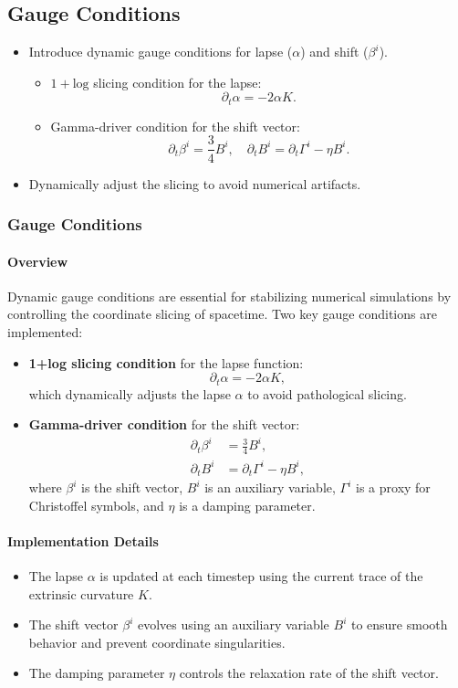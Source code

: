 \documentclass[12pt]{article}
\begin{document}
\subsection{Gauge Conditions}
\begin{itemize}
    \item Introduce dynamic gauge conditions for lapse ($\alpha$) and shift ($\beta^i$).
    \begin{itemize}
        \item $1+ \text{log}$ slicing condition for the lapse:
        \[
        \partial_t \alpha = -2 \alpha K.
        \]
        \item Gamma-driver condition for the shift vector:
        \[
        \partial_t \beta^i = \frac{3}{4} B^i, \quad \partial_t B^i = \partial_t \Gamma^i - \eta B^i.
        \]
    \end{itemize}
    \item Dynamically adjust the slicing to avoid numerical artifacts.
\end{itemize}

\subsubsection{Gauge Conditions}

\paragraph{Overview}
Dynamic gauge conditions are essential for stabilizing numerical simulations by controlling the coordinate slicing of spacetime. Two key gauge conditions are implemented:
\begin{itemize}
    \item \textbf{1+log slicing condition} for the lapse function:
    \[
    \partial_t \alpha = -2 \alpha K,
    \]
    which dynamically adjusts the lapse $\alpha$ to avoid pathological slicing.
    \item \textbf{Gamma-driver condition} for the shift vector:
    \begin{align*}
    \partial_t \beta^i &= \frac{3}{4} B^i, \\
    \partial_t B^i &= \partial_t \Gamma^i - \eta B^i,
    \end{align*}
    where $\beta^i$ is the shift vector, $B^i$ is an auxiliary variable, $\Gamma^i$ is a proxy for Christoffel symbols, and $\eta$ is a damping parameter.
\end{itemize}

\paragraph{Implementation Details}
\begin{itemize}
    \item The lapse $\alpha$ is updated at each timestep using the current trace of the extrinsic curvature $K$.
    \item The shift vector $\beta^i$ evolves using an auxiliary variable $B^i$ to ensure smooth behavior and prevent coordinate singularities.
    \item The damping parameter $\eta$ controls the relaxation rate of the shift vector.
\end{itemize}
\end{document}

